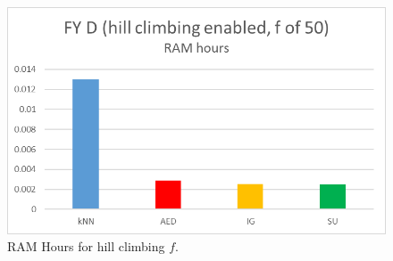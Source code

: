 \begin{figure}[hp]
\includegraphics[scale=0.17]{Graphs/FY_D/H_mem}
\caption{RAM Hours for hill climbing $f$.}
\label{fig:mem_h}
\end{figure}
